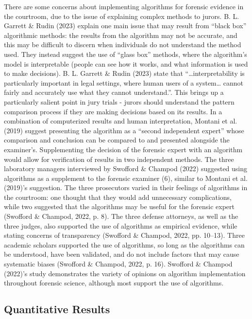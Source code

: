 \documentclass[print]{nuthesis}
\begin{document}
There are some concerns about implementing algorithms for forensic evidence in the courtroom, due to the issue of explaining complex methods to jurors.
B. L. Garrett \& Rudin (2023) explain one main issue that may result from ``black box'' algorithmic methods: the results from the algorithm may not be accurate, and this may be difficult to discern when individuals do not understand the method used.
They instead suggest the use of ``glass box'' methods, where the algorithm's model is interpretable (people can see how it works, and what information is used to make decisions).
B. L. Garrett \& Rudin (2023) state that ``\ldots interpretability is particularly important in legal settings, where human users of a system\ldots{} cannot fairly and accurately use what they cannot understand.''.
This brings up a particularly salient point in jury trials - jurors should understand the pattern comparison process if they are making decisions based on its results.
In a combination of computerized results and human interpretation, Montani et al. (2019) suggest presenting the algorithm as a ``second independent expert'' whose comparison and conclusion can be compared to and presented alongside the examiner's.
Supplementing the decision of the forensic expert with an algorithm would allow for verification of results in two independent methods.
The three laboratory managers interviewed by Swofford \& Champod (2022) suggested using algorithms as a supplement to the forensic examiner (6), similar to Montani et al. (2019)'s suggestion.
The three prosecutors varied in their feelings of algorithms in the courtroom: one thought that they would add unnecessary complications, while two suggested that the algorithms may be useful for the forensic expert (Swofford \& Champod, 2022, p. 8).
The three defense attorneys, as well as the three judges, also supported the use of algorithms as empirical evidence, while stating concerns of transparency (Swofford \& Champod, 2022, pp. 10--13).
Three academic scholars supported the use of algorithms, so long as the algorithms can be understood, have been validated, and do not include factors that may cause systematic biases (Swofford \& Champod, 2022, p. 16).
Swofford \& Champod (2022)'s study demonstrates the variety of opinions on algorithm implementation throughout forensic science, although most support the use of algorithms.

\hypertarget{quantitative-results}{%
\subsection{Quantitative Results}\label{quantitative-results}}
\end{document}
